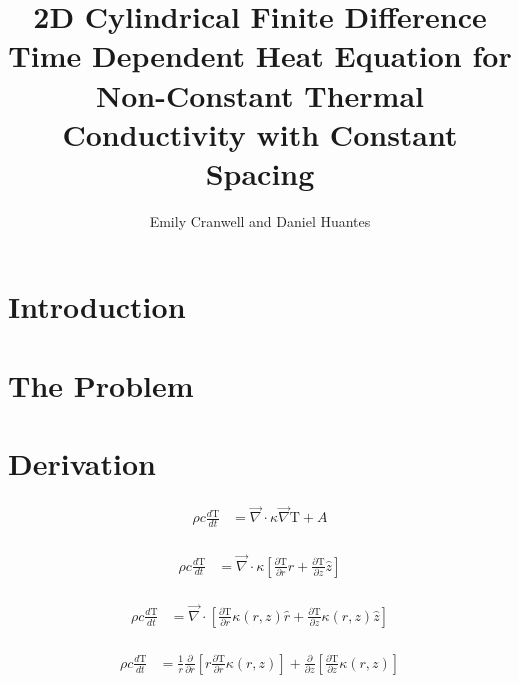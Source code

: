 \documentclass[12pt]{article}
\begin{document}
\title{2D Cylindrical Finite Difference Time Dependent Heat Equation for Non-Constant Thermal Conductivity with Constant Spacing}
\author{Emily Cranwell and Daniel Huantes}
\maketitle
\section{Introduction}

\section{The Problem}

\section{Derivation}

\begin{equation}
  \begin{aligned}
    \rho c \frac{d\mathrm{T}}{dt} &= \vec\nabla \cdot \kappa \vec\nabla \mathrm{T} + A \\
  \end{aligned}
\end{equation}

\begin{equation}
  \begin{aligned}
    \rho c \frac{d\mathrm{T}}{dt} &= \vec\nabla \cdot \kappa \left [  \frac{\partial\mathrm{T}}{\partial r}\hat r  + \frac{\partial\mathrm{T}}{\partial z}\hat z \right ] \\
  \end{aligned}
\end{equation}

\begin{equation}
  \begin{aligned}
    \rho c \frac{d\mathrm{T}}{dt} &= \vec\nabla \cdot \left [  \frac{\partial\mathrm{T}}{\partial r}\kappa(r, z) \hat r  + \frac{\partial\mathrm{T}}{\partial z}\kappa(r, z) \hat z \right ] \\
  \end{aligned}
\end{equation}

\begin{equation}
  \begin{aligned}
    \rho c \frac{d\mathrm{T}}{dt} &= \frac{1}{r}\frac{\partial}{\partial r}  \left [ r \frac{\partial\mathrm{T}}{\partial r}\kappa(r, z) \right ]  + \frac{\partial}{\partial z} \left [ \frac{\partial\mathrm{T}}{\partial z}\kappa(r, z)  \right ] \\
  \end{aligned}
\end{equation}
\end{document}
